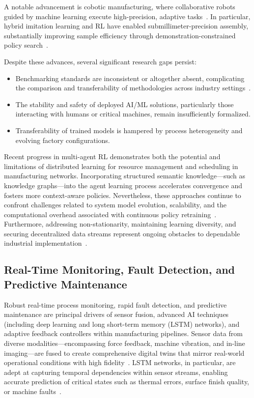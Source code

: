 \documentclass[sigconf]{acmart}
\begin{document}
A notable advancement is cobotic manufacturing, where collaborative robots guided by machine learning execute high-precision, adaptive tasks~\cite{ref42,ref44,ref45}. In particular, hybrid imitation learning and RL have enabled submillimeter-precision assembly, substantially improving sample efficiency through demonstration-constrained policy search~\cite{ref44}.

Despite these advances, several significant research gaps persist:
\begin{itemize}
    \item Benchmarking standards are inconsistent or altogether absent, complicating the comparison and transferability of methodologies across industry settings~\cite{ref56}.
    \item The stability and safety of deployed AI/ML solutions, particularly those interacting with humans or critical machines, remain insufficiently formalized.
    \item Transferability of trained models is hampered by process heterogeneity and evolving factory configurations.
\end{itemize}

Recent progress in multi-agent RL demonstrates both the potential and limitations of distributed learning for resource management and scheduling in manufacturing networks. Incorporating structured semantic knowledge—such as knowledge graphs—into the agent learning process accelerates convergence and fosters more context-aware policies. Nevertheless, these approaches continue to confront challenges related to system model evolution, scalability, and the computational overhead associated with continuous policy retraining~\cite{ref13,ref30}. Furthermore, addressing non-stationarity, maintaining learning diversity, and securing decentralized data streams represent ongoing obstacles to dependable industrial implementation~\cite{ref13,ref56}.

\subsection{Real-Time Monitoring, Fault Detection, and Predictive Maintenance}

Robust real-time process monitoring, rapid fault detection, and predictive maintenance are principal drivers of sensor fusion, advanced AI techniques (including deep learning and long short-term memory (LSTM) networks), and adaptive feedback controllers within manufacturing pipelines. Sensor data from diverse modalities—encompassing force feedback, machine vibration, and in-line imaging—are fused to create comprehensive digital twins that mirror real-world operational conditions with high fidelity~\cite{ref2, ref5, ref6, ref7, ref15, ref20, ref27, ref44, ref47, ref48, ref58, ref59}. LSTM networks, in particular, are adept at capturing temporal dependencies within sensor streams, enabling accurate prediction of critical states such as thermal errors, surface finish quality, or machine faults~\cite{ref5, ref15, ref48, ref59}.
\end{document}

